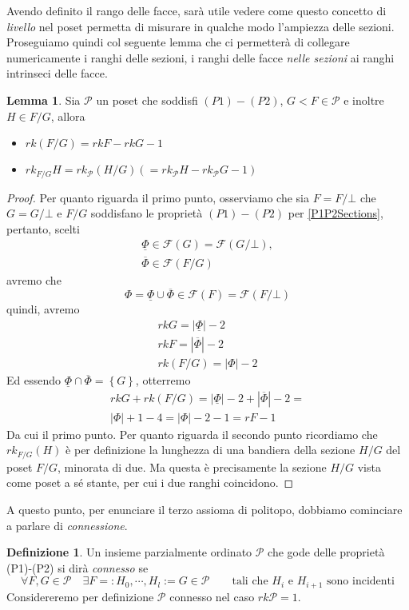 \documentclass[a4paper,12pt]{report}
\newcommand{\p}{\mathcal{P}}
\theoremstyle{plain}
\theoremstyle{definition}
\newtheorem{defin}[teo]{Definizione}
\newtheorem{lem}[teo]{Lemma}
\begin{document}
Avendo definito il rango delle facce, sar\`a utile vedere come questo concetto di \emph{livello} nel poset permetta
di misurare in qualche modo l'ampiezza delle sezioni.
Proseguiamo quindi col seguente lemma che ci permetter\`a di collegare numericamente i ranghi delle sezioni, i ranghi delle facce \emph{nelle sezioni}
ai ranghi intrinseci delle facce.
\begin{lem}
\label{lem:SectionRanks}
Sia $\p$ un poset che soddisfi $(P1)-(P2)$, $G<F\in\p$ e inoltre $H\in F/G$, allora
\begin{itemize}
\item $rk(F/G)=rkF-rkG-1$
\item $rk_{F/G}H=rk_\p(H/G)(=rk_\p H-rk_\p G-1)$
\end{itemize}
\end{lem}
\begin{proof}
Per quanto riguarda il primo punto, osserviamo che sia $F=F/\bot$ che $G=G/\bot$ e $F/G$ soddisfano le propriet\`a $(P1)-(P2)$ per
\ref{P1P2Sections}, pertanto, scelti
\begin{gather*}
\underline{\Phi}\in\mathcal{F}(G)=\mathcal{F}(G/\bot),\\
\overline{\Phi}\in\mathcal{F}(F/G)
\end{gather*}
avremo che
\begin{equation*}
\Phi=\underline{\Phi}\cup\overline{\Phi}\in\mathcal{F}(F)=\mathcal{F}(F/\bot)
\end{equation*}
quindi, avremo
\begin{gather*}
rkG=|\underline{\Phi}|-2\\
rkF=|\overline{\Phi}|-2\\
rk(F/G)=|\Phi|-2
\end{gather*}
Ed essendo $\underline{\Phi}\cap\overline{\Phi}=\left\{G\right\}$, otterremo
\begin{gather*}
rkG+rk(F/G)=|\underline{\Phi}|-2+|\overline{\Phi}|-2=\\
|\Phi|+1-4=|\Phi|-2-1=rF-1
\end{gather*}
Da cui il primo punto. Per quanto riguarda il secondo punto ricordiamo che $rk_{F/G}(H)$ \`e per definizione la lunghezza di una bandiera
della sezione $H/G$ del poset $F/G$, minorata di due. Ma questa \`e precisamente la sezione $H/G$ vista come poset a s\'e stante, per cui
i due ranghi coincidono.
\end{proof}
A questo punto, per enunciare il terzo assioma di politopo, dobbiamo cominciare a parlare di \emph{connessione}.
\begin{defin}
Un insieme parzialmente ordinato $\p$ che gode delle propriet\`a (P1)-(P2) si dir\`a \emph{connesso} se
\begin{equation*}
\forall F,G\in\p\quad\exists F=:H_0,\cdots,H_l:=G\in\p\qquad \text{tali che }H_i\text{ e }H_{i+1}\text{ sono incidenti}
\end{equation*}
Considereremo per definizione $\p$ connesso nel caso $rk\p=1$.
\end{defin}
\end{document}
